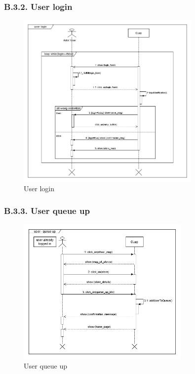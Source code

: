 \subsubsection{B.3.2. User login}

\begin{figure}[H]
\centering
\includegraphics[width=0.8\textwidth]{sequence_diagrams/sequence_diagram_user_login}
\caption{User login}
\end{figure}

\subsubsection{B.3.3. User queue up}

\begin{figure}[H]
\centering
\includegraphics[width=0.75\textwidth]{sequence_diagrams/sequence_diagram_user_queue_up}
\caption{User queue up}
\end{figure}

